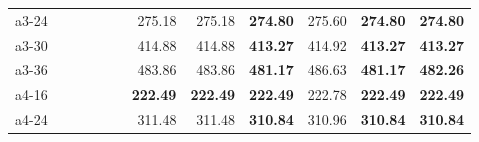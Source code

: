 \documentclass[aspectratio=1610]{beamer}
\begin{document}
\begin{frame}
\begin{table}[]
{\begin{tabular}{lrrrrrrrrrrr}
a3-24                                          &                                                         & \multicolumn{1}{r|}{}                &                                                              & \textbf{}       & \multicolumn{1}{r|}{}                                       & 275.18              & \multicolumn{1}{r|}{275.18}                                    & \textbf{274.80}   & \multicolumn{1}{r|}{275.60}                                  & \textbf{274.80}               & {\color[HTML]{FE0000} \textbf{274.80}}               \\
a3-30                                          &                                                         & \multicolumn{1}{r|}{}                &                                                              &                 & \multicolumn{1}{r|}{}                                       & 414.88              & \multicolumn{1}{r|}{414.88}                                    & \textbf{413.27}   & \multicolumn{1}{r|}{414.92}                                  & \textbf{413.27}               & {\color[HTML]{FE0000} \textbf{413.27}}               \\
a3-36                                          &                                                         & \multicolumn{1}{r|}{}                &                                                              &                 & \multicolumn{1}{r|}{}                                       & 483.86              & \multicolumn{1}{r|}{483.86}                                    & \textbf{481.17}   & \multicolumn{1}{r|}{486.63}                                  & \textbf{481.17}               & {\color[HTML]{FE0000} \textbf{482.26}}               \\
a4-16                                          &                                                         & \multicolumn{1}{r|}{}                &                                                              & \textbf{}       & \multicolumn{1}{r|}{}                                       & \textbf{222.49}     & \multicolumn{1}{r|}{{\color[HTML]{FE0000} \textbf{222.49}}}    & \textbf{222.49}   & \multicolumn{1}{r|}{222.78}                                  & \textbf{222.49}               & {\color[HTML]{FE0000} \textbf{222.49}}               \\
a4-24                                          &                                                         & \multicolumn{1}{r|}{}                &                                                              &                 & \multicolumn{1}{r|}{}                                       & 311.48              & \multicolumn{1}{r|}{311.48}                                    & \textbf{310.84}   & \multicolumn{1}{r|}{310.96}                                  & \textbf{310.84}               & {\color[HTML]{FE0000} \textbf{310.84}}               \\

\end{tabular}}
\end{table}
\end{frame}
\end{document}
